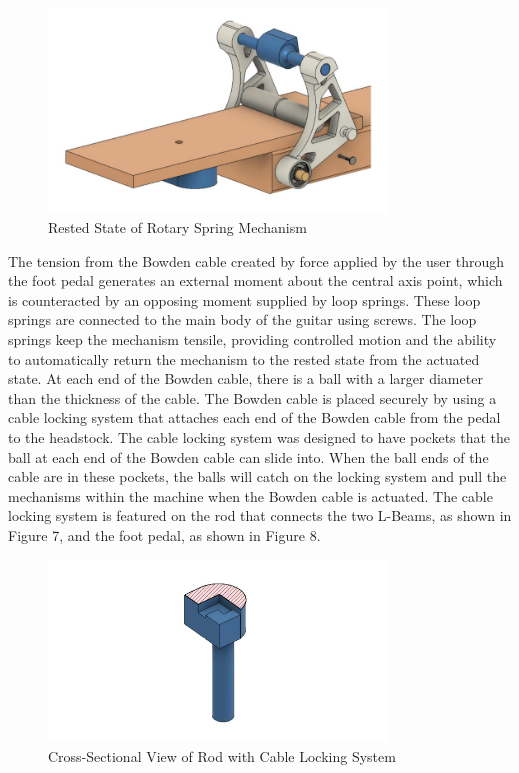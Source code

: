 \documentclass[12pt]{article}
\theoremstyle{definition} %
\theoremstyle{plain} %
\begin{document}
\begin{figure}[htbp]
  \centering
  \includegraphics[width=0.8\textwidth]{classes/Mathematics-of-Guitar-Strings/06-10/fgs/fig6.png}
  \caption{Rested State of Rotary Spring Mechanism}
  \label{fig:}
\end{figure}

The tension from the Bowden cable created by force applied by the user through the foot
pedal generates an external moment about the central axis point, which is counteracted by an
opposing moment supplied by loop springs. These loop springs are connected to the main body of
the guitar using screws. The loop springs keep the mechanism tensile, providing controlled motion
and the ability to automatically return the mechanism to the rested state from the actuated state. At
each end of the Bowden cable, there is a ball with a larger diameter than the thickness of the cable.
The Bowden cable is placed securely by using a cable locking system that attaches each end of the
Bowden cable from the pedal to the headstock. The cable locking system was designed to have
pockets that the ball at each end of the Bowden cable can slide into. When the ball ends of the cable
are in these pockets, the balls will catch on the locking system and pull the mechanisms within the
machine when the Bowden cable is actuated. The cable locking system is featured on the rod that
connects the two L-Beams, as shown in Figure 7, and the foot pedal, as shown in Figure 8.

\begin{figure}[htbp]
  \centering
  \includegraphics[width=0.8\textwidth]{classes/Mathematics-of-Guitar-Strings/06-10/fgs/fig7.png}
  \caption{Cross-Sectional View of Rod with Cable Locking System}
  \label{fig:}
\end{figure}
\end{document}
